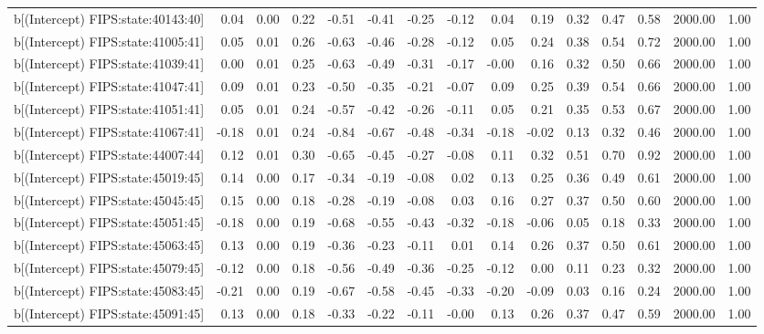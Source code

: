 \begin{table}[ht]
\begin{tabular}{rrrrrrrrrrrrrrr}
  b[(Intercept) FIPS:state:40143:40] & 0.04 & 0.00 & 0.22 & -0.51 & -0.41 & -0.25 & -0.12 & 0.04 & 0.19 & 0.32 & 0.47 & 0.58 & 2000.00 & 1.00 \\ 
  b[(Intercept) FIPS:state:41005:41] & 0.05 & 0.01 & 0.26 & -0.63 & -0.46 & -0.28 & -0.12 & 0.05 & 0.24 & 0.38 & 0.54 & 0.72 & 2000.00 & 1.00 \\ 
  b[(Intercept) FIPS:state:41039:41] & 0.00 & 0.01 & 0.25 & -0.63 & -0.49 & -0.31 & -0.17 & -0.00 & 0.16 & 0.32 & 0.50 & 0.66 & 2000.00 & 1.00 \\ 
  b[(Intercept) FIPS:state:41047:41] & 0.09 & 0.01 & 0.23 & -0.50 & -0.35 & -0.21 & -0.07 & 0.09 & 0.25 & 0.39 & 0.54 & 0.66 & 2000.00 & 1.00 \\ 
  b[(Intercept) FIPS:state:41051:41] & 0.05 & 0.01 & 0.24 & -0.57 & -0.42 & -0.26 & -0.11 & 0.05 & 0.21 & 0.35 & 0.53 & 0.67 & 2000.00 & 1.00 \\ 
  b[(Intercept) FIPS:state:41067:41] & -0.18 & 0.01 & 0.24 & -0.84 & -0.67 & -0.48 & -0.34 & -0.18 & -0.02 & 0.13 & 0.32 & 0.46 & 2000.00 & 1.00 \\ 
  b[(Intercept) FIPS:state:44007:44] & 0.12 & 0.01 & 0.30 & -0.65 & -0.45 & -0.27 & -0.08 & 0.11 & 0.32 & 0.51 & 0.70 & 0.92 & 2000.00 & 1.00 \\ 
  b[(Intercept) FIPS:state:45019:45] & 0.14 & 0.00 & 0.17 & -0.34 & -0.19 & -0.08 & 0.02 & 0.13 & 0.25 & 0.36 & 0.49 & 0.61 & 2000.00 & 1.00 \\ 
  b[(Intercept) FIPS:state:45045:45] & 0.15 & 0.00 & 0.18 & -0.28 & -0.19 & -0.08 & 0.03 & 0.16 & 0.27 & 0.37 & 0.50 & 0.60 & 2000.00 & 1.00 \\ 
  b[(Intercept) FIPS:state:45051:45] & -0.18 & 0.00 & 0.19 & -0.68 & -0.55 & -0.43 & -0.32 & -0.18 & -0.06 & 0.05 & 0.18 & 0.33 & 2000.00 & 1.00 \\ 
  b[(Intercept) FIPS:state:45063:45] & 0.13 & 0.00 & 0.19 & -0.36 & -0.23 & -0.11 & 0.01 & 0.14 & 0.26 & 0.37 & 0.50 & 0.61 & 2000.00 & 1.00 \\ 
  b[(Intercept) FIPS:state:45079:45] & -0.12 & 0.00 & 0.18 & -0.56 & -0.49 & -0.36 & -0.25 & -0.12 & 0.00 & 0.11 & 0.23 & 0.32 & 2000.00 & 1.00 \\ 
  b[(Intercept) FIPS:state:45083:45] & -0.21 & 0.00 & 0.19 & -0.67 & -0.58 & -0.45 & -0.33 & -0.20 & -0.09 & 0.03 & 0.16 & 0.24 & 2000.00 & 1.00 \\ 
  b[(Intercept) FIPS:state:45091:45] & 0.13 & 0.00 & 0.18 & -0.33 & -0.22 & -0.11 & -0.00 & 0.13 & 0.26 & 0.37 & 0.47 & 0.59 & 2000.00 & 1.00 \\ 

\end{tabular}
\end{table}
